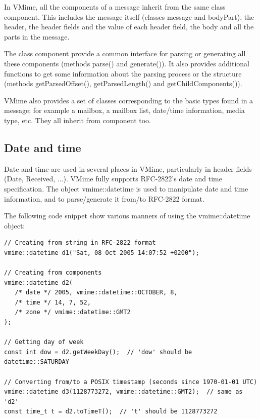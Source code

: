 In VMime, all the components of a message inherit from the same class
{\vcode component}. This includes the message itself (classes {\vcode message}
and {\vcode bodyPart}), the header, the header fields and the value of each
header field, the body and all the parts in the message.

The class component provide a common interface for parsing or generating all
these components (methods {\vcode parse()} and {\vcode generate()}). It also
provides additional functions to get some information about the parsing
process or the structure (methods {\vcode getParsedOffset()},
{\vcode getParsedLength()} and {\vcode getChildComponents()}).

VMime also provides a set of classes corresponding to the basic types found
in a message; for example a mailbox, a mailbox list, date/time information,
media type, etc. They all inherit from {\vcode component} too.

\subsection{Date and time} %

Date and time are used in several places in VMime, particularly in header
fields (Date, Received, ...). VMime fully supports RFC-2822's date and time
specification. The object {\vcode vmime::datetime} is used to manipulate date
and time information, and to parse/generate it from/to RFC-2822 format.

The following code snippet show various manners of using the
{\vcode vmime::datetime} object:

\begin{lstlisting}[caption={Using {\vcode vmime::datetime} object}]
// Creating from string in RFC-2822 format
vmime::datetime d1("Sat, 08 Oct 2005 14:07:52 +0200");

// Creating from components
vmime::datetime d2(
   /* date */ 2005, vmime::datetime::OCTOBER, 8,
   /* time */ 14, 7, 52,
   /* zone */ vmime::datetime::GMT2
);

// Getting day of week
const int dow = d2.getWeekDay();  // 'dow' should be datetime::SATURDAY

// Converting from/to a POSIX timestamp (seconds since 1970-01-01 UTC)
vmime::datetime d3(1128773272, vmime::datetime::GMT2);  // same as 'd2'
const time_t t = d2.toTimeT();  // 't' should be 1128773272
\end{lstlisting}

